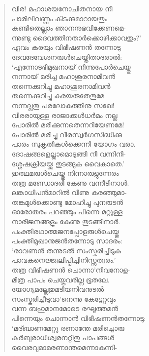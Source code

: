 \begin{verse}
വീര! മഹാശയനോചിതനായ നീ\\
പാരിലീവണ്ണം കിടക്കുമാറായതും\\
കണ്ടിതെല്ലാം ഞാനനുഭവിക്കേണമെ-\\
ന്നുണ്ടു ദൈവത്തിനതാര്‍ക്കൊഴിക്കാവതും?’\\
ഏവം കരയും വിഭീഷണന്‍ തന്നോടു\\
ദേവദേവേശനരുള്‍ചെയ്തിതാദരാല്‍:\\
‘എന്നോടഭിമുഖനായ് നിന്നുപോര്‍ചെയ്തു\\
നന്നായ് മരിച്ച മഹാശൂരനാമിവന്‍\\
തന്നെക്കുറിച്ചു മഹാശൂരനാമിവന്‍\\
തന്നെക്കുറിച്ചു കരയരുതേതുമേ\\
നന്നല്ലതു പരലോകത്തിനു സഖേ!\\
വീരരായുള്ള രാജാക്കള്‍ധര്‍മം നല്ല\\
പോരില്‍ മരിക്കുന്നതെന്നറിയേണമേ!\\
പോരില്‍ മരിച്ചു വീരസ്വര്‍ഗസിദ്ധിക്കു\\
പാരം സുകൃതികള്‍ക്കെന്നി യോഗം വരാ.\\
ദോഷങ്ങളെല്ലാമൊടുങ്ങി നീ വന്നിനി-\\
ശ്ശേഷക്രിയയ്ക്കു തുടങ്ങുക വൈകാതെ.’\\
ഇത്ഥമരുള്‍ചെയ്തു നിന്നാരുളുന്നേരം\\
തത്ര മണ്ഡോദരി കേണു വന്നീടിനാള്‍.\\
ലങ്കാധിപന്‍മാറില്‍ വീണു കരഞ്ഞുമാ-\\
തങ്കമുള്‍ക്കൊണ്ടു മോഹിച്ചു പുനരുടന്‍\\
ഓരോതരം പറഞ്ഞും പിന്നെ മറ്റുള്ള\\
നാരീജനങ്ങളും കേണു തുടങ്ങിനാര്‍.\\
പംക്തിരഥാത്മജനപ്പോളരുള്‍ചെയ്തു\\
പംക്തിമുഖാനുജന്‍തന്നോടു സാദരം:\\
‘രാവണന്‍ തന്നുടല്‍ സംസ്കരിച്ചീടുക\\
പാവകനെജ്ജ്വലിപ്പിച്ചിനിസ്സത്വരം.’\\
തത്ര വിഭീഷണന്‍ ചൊന്നാ’നിവനോള-\\
മിത്ര പാപം ചെയ്തവരില്ല ഭൂതലേ.\\
യോഗ്യമല്ലേതുമടിയനിവനുടല്‍\\
സംസ്കരിച്ചീടുവാ’നെന്നു കേട്ടേറ്റവും\\
വന്ന ബഹുമാനമോടെ രഘൂത്തമന്‍\\
പിന്നെയും ചൊന്നാന്‍ വിഭീഷണന്‍തന്നോടു:\\
‘മദ്ബാണമേറ്റു രണാന്തേ മരിച്ചൊരു\\
കര്‍ബുരാധീശ്വരനറ്റിതു പാപങ്ങള്‍\\
വൈരവുമാമരണാന്തമെന്നാകുന്നി-\\

\end{verse}
